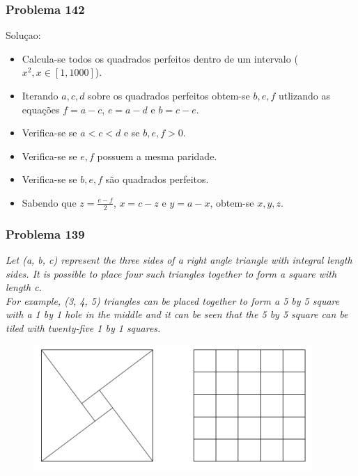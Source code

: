 \documentclass{beamer}
\begin{document}
\begin{frame}
    \frametitle{Problema 142}

    Soluçao: \\

    \begin{itemize}
        \item Calcula-se todos os quadrados perfeitos dentro de um intervalo ($x^2, x \in [1, 1000]$).
        \item Iterando $a, c, d$ sobre os quadrados perfeitos obtem-se $b, e, f$ utlizando as equações $f=a-c$, $e=a-d$ e $b=c-e$.
        \item Verifica-se se $a<c<d$ e se $b, e, f > 0$.
        \item Verifica-se se $e, f$ possuem a mesma paridade.
        \item Verifica-se se $b, e, f$ são quadrados perfeitos.
        \item Sabendo que $z=\frac{e-f}{2}$, $x=c-z$ e $y=a-x$, obtem-se $x, y, z$.
    \end{itemize}

    \begin{center}
    \end{center}
\end{frame}

\begin{frame}
    \frametitle{Problema 139}

    \begin{center}
        \textit{
            Let (a, b, c) represent the three sides of a right angle triangle with integral length sides. It is possible to place four such triangles together to form a square with length c.\\
            For example, (3, 4, 5) triangles can be placed together to form a 5 by 5 square with a 1 by 1 hole in the middle and it can be seen that the 5 by 5 square can be tiled with twenty-five 1 by 1 squares.
        }
    \end{center}
    \begin{figure}[htpb]
        \centering
        \includegraphics[width=0.4\linewidth]{images/p139.png}
    \end{figure}
\end{frame}
\end{document}
